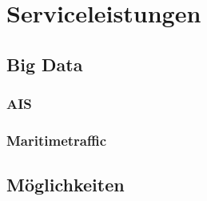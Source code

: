 
\chapter{Serviceleistungen}


\section{Big Data}


\subsection{AIS}


\subsection{Maritimetraffic}


\section{Möglichkeiten}

